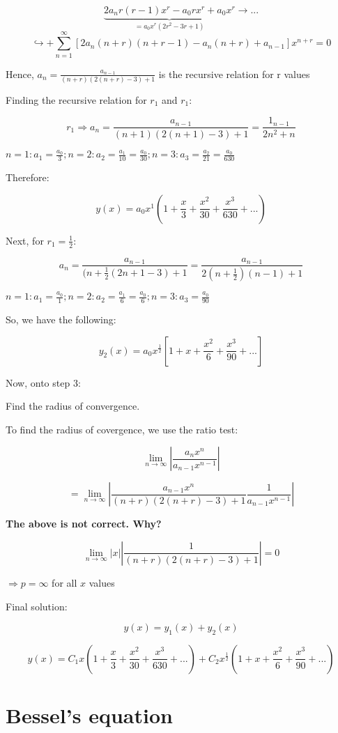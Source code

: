 $$\underbrace{2 a_n r(r-1)x^r - a_0 r x^r + a_0 x^r}_{ = a_0 x^r \left( 2r^2 - 3r + 1 \right)} \longrightarrow ...$$
$$\hookrightarrow + \sum_{n = 1}^\infty \left[ 2 a_n (n+r) (n+r-1) - a_n (n+r) + a_{n-1} \right] x^{n+r} = 0$$

Hence, $a_n = \frac{a_{n-1}}{(n+r)(2(n+r)-3) + 1}$ is the recursive relation for r values

Finding the recursive relation for $r_1$ and $r_1$:

$$r_1 \Rightarrow a_n = \frac{a_{n-1}}{(n+1)(2(n+1)-3)+1} = \frac{1_{n-1}}{2n^2 + n}$$

$n = 1: a_1 = \frac{a_0}{3}; n = 2: a_2 = \frac{a_1}{10} = \frac{a_0}{30}; n = 3: a_3 = \frac{a_2}{21} = \frac{a_0}{630}$

Therefore:

$$y(x) = a_0 x^1 (1 + \frac{x}{3} + \frac{x^2}{30} + \frac{x^3}{630} + ...)$$

Next, for $r_1 = \frac{1}{2}$:

$$a_n  =\frac{a_{n-1}}{(n + \frac{1}{2} (2n+1-3) + 1} = \frac{a_{n-1}}{2(n + \frac{1}{2})(n-1) + 1}$$

$n = 1: a_1 = \frac{a_0}{1}; n = 2:  a_2 = \frac{a_1}{6} = \frac{a_0}{6}; n = 3: a_3 = \frac{a_0}{90}$

So, we have the following:

$$y_2(x) = a_0 x^{\frac{1}{2}} \left[ 1 + x + \frac{x^2}{6} + \frac{x^3}{90} + ... \right]$$

Now, onto step 3:

Find the radius of convergence. 

To find the radius of covergence, we use the ratio test:

$$\lim_{n \to \infty} | \frac{a_n x^n}{a_{n-1}x^{n-1}}|$$

$$ = \lim_{n \to \infty} | \frac{a_{n-1} x^n}{(n+r) (2(n+r)-3) + 1} \frac{1}{a_{n-1} x^{n-1}} |$$

\textbf{The above is not correct. Why?}

$$\lim_{n \to \infty} |x| |\frac{1}{(n+r) (2(n+r)-3)+1}| = 0$$

$\Rightarrow p = \infty$ for all $x$ values

Final solution:

$$y(x) = y_1(x) + y_2(x)$$

$$y(x) = C_1 x \left(1 + \frac{x}{3} + \frac{x^2}{30} + \frac{x^3}{630} + ... \right) + C_2 x^\frac{1}{2} \left(1+x+\frac{x^2}{6} + \frac{x^3}{90} + ... \right)$$


\section{Bessel's equation}

